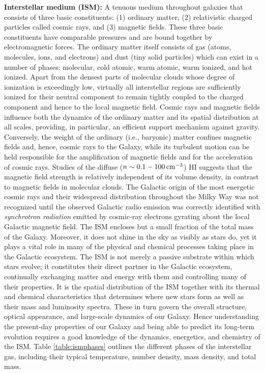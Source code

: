\documentclass[a4paper,10pt]{article}
\begin{document}
{\noindent}\textbf{Interstellar medium (ISM):} A tenuous medium throughout galaxies that consists of three basic constituents: (1) ordinary matter, (2) relativistic charged particles called cosmic rays, and (3) magnetic fields. These three basic constituents have comparable pressures and are bound together by electromagnetic forces. The ordinary matter itself consists of gas (atoms, molecules, ions, and electrons) and dust (tiny solid particles) which can exist in a number of phases: molecular, cold atomic, warm atomic, warm ionized, and hot ionized. Apart from the densest parts of molecular clouds whose degree of ionization is exceedingly low, virtually all interstellar regions are sufficiently ionized for their neutral component to remain tightly coupled to the charged component and hence to the local magnetic field. Cosmic rays and magnetic fields influence both the dynamics of the ordinary matter and its spatial distribution at all scales, providing, in particular, an efficient support mechanism against gravity. Conversely, the weight of the ordinary (i.e., baryonic) matter confines magnetic fields and, hence, cosmic rays to the Galaxy, while its turbulent motion can be held responsible for the amplification of magnetic fields and for the acceleration of cosmic rays. Studies of the diffuse ($n\sim0.1-100\,{\rm cm^{-3}}$) HI suggests that the magnetic field strength is relatively independent of its volume density, in contrast to magnetic fields in molecular clouds. The Galactic origin of the most energetic cosmic rays and their widespread distribution throughout the Milky Way was not recognized until the observed Galactic radio emission was correctly identified with \textit{synchrotron radiation} emitted by cosmic-ray electrons gyrating about the local Galactic magnetic field. The ISM encloses but a small fraction of the total mass of the Galaxy. Moreover, it does not shine in the sky as visibly as stars do, yet it plays a vital role in many of the physical and chemical processes taking place in the Galactic ecosystem. The ISM is not merely a passive substrate within which stars evolve; it constitutes their direct partner in the Galactic ecosystem, continually exchanging matter and energy with them and controlling many of their properties. It is the spatial distribution of the ISM together with its thermal and chemical characteristics that determines where new stars form as well as their mass and luminosity spectra. These in turn govern the overall structure, optical appearance, and large-scale dynamics of our Galaxy. Hence understanding the present-day properties of our Galaxy and being able to predict its long-term evolution requires a good knowledge of the dynamics, energetics, and chemistry of the ISM. Table \ref{table:ismphases} outlines the different phases of the interstellar gas, including their typical temperature, number density, mass density, and total mass.
\end{document}
